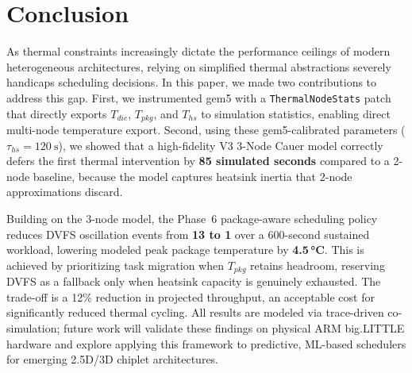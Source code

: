 \section{Conclusion}
\label{sec:conclusion}

As thermal constraints increasingly dictate the performance ceilings of modern heterogeneous architectures, relying on simplified thermal abstractions severely handicaps scheduling decisions. In this paper, we made two contributions to address this gap. First, we instrumented gem5 with a \texttt{ThermalNodeStats} patch that directly exports $T_{die}$, $T_{pkg}$, and $T_{hs}$ to simulation statistics, enabling direct multi-node temperature export. Second, using these gem5-calibrated parameters ($\tau_{hs} = \SI{120}{\second}$), we showed that a high-fidelity V3 3-Node Cauer model correctly defers the first thermal intervention by \textbf{85 simulated seconds} compared to a 2-node baseline, because the model captures heatsink inertia that 2-node approximations discard.

Building on the 3-node model, the Phase~6 package-aware scheduling policy reduces DVFS oscillation events from \textbf{13 to 1} over a 600-second sustained workload, lowering modeled peak package temperature by \textbf{4.5\,°C}. This is achieved by prioritizing task migration when $T_{pkg}$ retains headroom, reserving DVFS as a fallback only when heatsink capacity is genuinely exhausted. The trade-off is a 12\% reduction in projected throughput, an acceptable cost for significantly reduced thermal cycling. All results are modeled via trace-driven co-simulation; future work will validate these findings on physical ARM big.LITTLE hardware and explore applying this framework to predictive, ML-based schedulers for emerging 2.5D/3D chiplet architectures.
